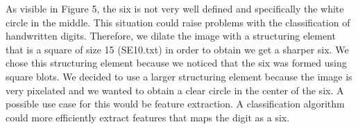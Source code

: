 \documentclass{article}
\begin{document}
\begin{flushleft}
As visible in Figure 5, the six is not very well defined and specifically the white circle in the middle. This situation could raise problems with the classification of handwritten digits. Therefore, we dilate the image with a structuring element that is a square of size 15 (SE10.txt) in order to obtain we get a sharper six. We chose this structuring element because we noticed that the six was formed using square blots. We decided to use a larger structuring element because the image is very pixelated and we wanted to obtain a clear circle in the center of the six.
A possible use case for this would be feature extraction. A classification algorithm could more efficiently extract features that maps the digit as a six.
\end{flushleft}
\vspace{8mm}
\end{document}

